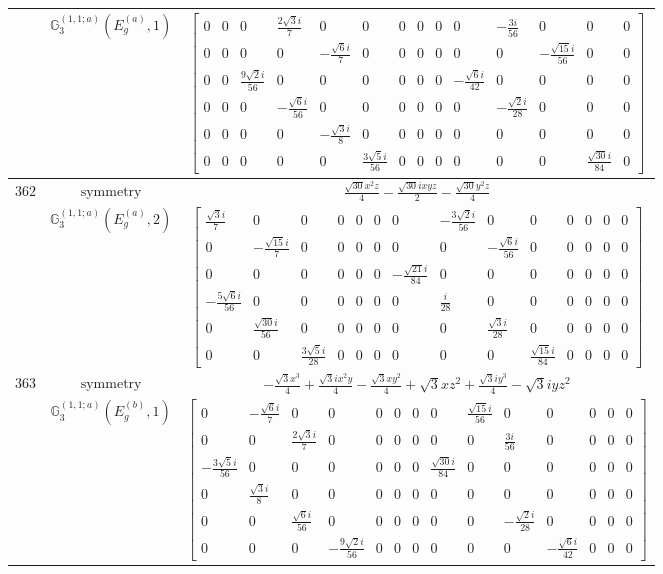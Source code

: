 \documentclass[fleqn,8pt,landscape]{jsarticle}
\begin{document}
\begin{longtable}{ccc}
$  $ & $ \mathbb{G}_{3}^{(1,1;a)}(E_{g}^{(a)},1) $ & $ \begin{bmatrix} 0 & 0 & 0 & \frac{2 \sqrt{3} i}{7} & 0 & 0 & 0 & 0 & 0 & 0 & - \frac{3 i}{56} & 0 & 0 & 0 \\ 0 & 0 & 0 & 0 & - \frac{\sqrt{6} i}{7} & 0 & 0 & 0 & 0 & 0 & 0 & - \frac{\sqrt{15} i}{56} & 0 & 0 \\ 0 & 0 & \frac{9 \sqrt{2} i}{56} & 0 & 0 & 0 & 0 & 0 & 0 & - \frac{\sqrt{6} i}{42} & 0 & 0 & 0 & 0 \\ 0 & 0 & 0 & - \frac{\sqrt{6} i}{56} & 0 & 0 & 0 & 0 & 0 & 0 & - \frac{\sqrt{2} i}{28} & 0 & 0 & 0 \\ 0 & 0 & 0 & 0 & - \frac{\sqrt{3} i}{8} & 0 & 0 & 0 & 0 & 0 & 0 & 0 & 0 & 0 \\ 0 & 0 & 0 & 0 & 0 & \frac{3 \sqrt{5} i}{56} & 0 & 0 & 0 & 0 & 0 & 0 & \frac{\sqrt{30} i}{84} & 0 \end{bmatrix} $ \\ \hline
$ 362 $ & $ \text{symmetry} $ & $ \frac{\sqrt{30} x^{2} z}{4} - \frac{\sqrt{30} i x y z}{2} - \frac{\sqrt{30} y^{2} z}{4} $ \\
$  $ & $ \mathbb{G}_{3}^{(1,1;a)}(E_{g}^{(a)},2) $ & $ \begin{bmatrix} \frac{\sqrt{3} i}{7} & 0 & 0 & 0 & 0 & 0 & 0 & - \frac{3 \sqrt{2} i}{56} & 0 & 0 & 0 & 0 & 0 & 0 \\ 0 & - \frac{\sqrt{15} i}{7} & 0 & 0 & 0 & 0 & 0 & 0 & - \frac{\sqrt{6} i}{56} & 0 & 0 & 0 & 0 & 0 \\ 0 & 0 & 0 & 0 & 0 & 0 & - \frac{\sqrt{21} i}{84} & 0 & 0 & 0 & 0 & 0 & 0 & 0 \\ - \frac{5 \sqrt{6} i}{56} & 0 & 0 & 0 & 0 & 0 & 0 & \frac{i}{28} & 0 & 0 & 0 & 0 & 0 & 0 \\ 0 & \frac{\sqrt{30} i}{56} & 0 & 0 & 0 & 0 & 0 & 0 & \frac{\sqrt{3} i}{28} & 0 & 0 & 0 & 0 & 0 \\ 0 & 0 & \frac{3 \sqrt{5} i}{28} & 0 & 0 & 0 & 0 & 0 & 0 & \frac{\sqrt{15} i}{84} & 0 & 0 & 0 & 0 \end{bmatrix} $ \\ \hline
$ 363 $ & $ \text{symmetry} $ & $ - \frac{\sqrt{3} x^{3}}{4} + \frac{\sqrt{3} i x^{2} y}{4} - \frac{\sqrt{3} x y^{2}}{4} + \sqrt{3} x z^{2} + \frac{\sqrt{3} i y^{3}}{4} - \sqrt{3} i y z^{2} $ \\
$  $ & $ \mathbb{G}_{3}^{(1,1;a)}(E_{g}^{(b)},1) $ & $ \begin{bmatrix} 0 & - \frac{\sqrt{6} i}{7} & 0 & 0 & 0 & 0 & 0 & 0 & \frac{\sqrt{15} i}{56} & 0 & 0 & 0 & 0 & 0 \\ 0 & 0 & \frac{2 \sqrt{3} i}{7} & 0 & 0 & 0 & 0 & 0 & 0 & \frac{3 i}{56} & 0 & 0 & 0 & 0 \\ - \frac{3 \sqrt{5} i}{56} & 0 & 0 & 0 & 0 & 0 & 0 & \frac{\sqrt{30} i}{84} & 0 & 0 & 0 & 0 & 0 & 0 \\ 0 & \frac{\sqrt{3} i}{8} & 0 & 0 & 0 & 0 & 0 & 0 & 0 & 0 & 0 & 0 & 0 & 0 \\ 0 & 0 & \frac{\sqrt{6} i}{56} & 0 & 0 & 0 & 0 & 0 & 0 & - \frac{\sqrt{2} i}{28} & 0 & 0 & 0 & 0 \\ 0 & 0 & 0 & - \frac{9 \sqrt{2} i}{56} & 0 & 0 & 0 & 0 & 0 & 0 & - \frac{\sqrt{6} i}{42} & 0 & 0 & 0 \end{bmatrix} $ \\ \hline

\end{longtable}
\end{document}
